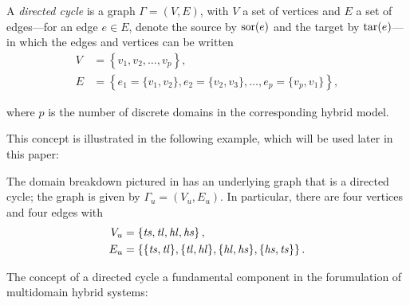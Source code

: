 \begin{definition}
A {\em directed cycle} is a graph $\Gamma = (V, E)$, with $V$ a set of vertices and $E$ a set of edges---for an edge $e \in E$, denote the source by $\mathrm{sor}(e)$ and the target by $\mathrm{tar}(e)$---in which the edges and vertices can be written
\begin{align}
\label{eqn:directedcyclep}
    V &= \left\{v_{1}, v_{2}, \ldots, v_{p}\right\},\\
    E &= \left\{e_{1} = \{v_{1}, v_{2}\}, e_{2} = \{v_{2}, v_{3}\}, \ldots, e_{p} = \{v_{p}, v_{1}\}\right\},
\end{align}
\end{definition}
where $p$ is the number of discrete domains in the corresponding hybrid model.

This concept is illustrated in the following example, which will be used later in this paper:

\begin{exmp} \label{universalgraph}
The domain breakdown pictured in  has an underlying graph that is a directed cycle; the graph is given by $\Gamma_{u} = (V_{u}, E_{u})$. In particular, there are four vertices and four edges with
\begin{align}
    V_u &= \left\{\mathit{ts}, \mathit{tl}, \mathit{hl}, \mathit{hs}\right\},\\
    E_u &= \left\{\{\mathit{ts}, \mathit{tl}\}, \{\mathit{tl}, \mathit{hl}\}, \{\mathit{hl}, \mathit{hs}\}, \{\mathit{hs}, \mathit{ts}\}\right\}.
\end{align}
\end{exmp}

The concept of a directed cycle a fundamental component in the forumulation of multidomain hybrid systems:

